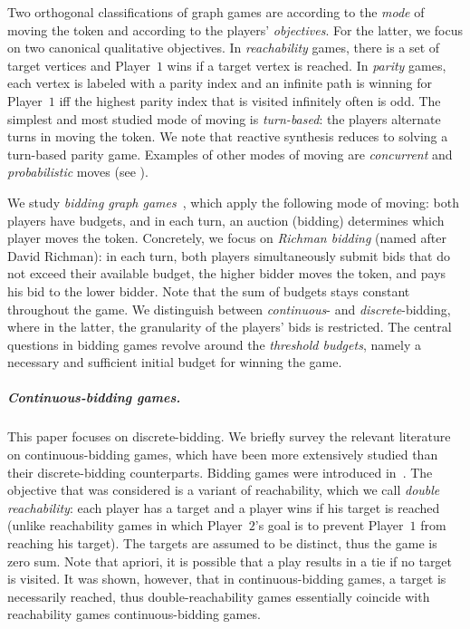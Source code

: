 \documentclass{article}\providecommand{\nequiv}{\not\equiv}\usepackage[a4paper,margin=20mm]{geometry}
\newcommand{\PO}{Player~$1$\xspace}
\newcommand{\PT}{Player~$2$\xspace}
\begin{document}
Two orthogonal classifications of graph games are according to the {\em mode} of moving the token and according to the players' {\em objectives}. For the latter, we focus on two canonical qualitative objectives. In {\em reachability} games, there is a set of target vertices and \PO wins if a target vertex is reached. 
In {\em parity} games, each vertex is labeled with a parity index and an infinite path is winning for \PO iff the highest parity index that is visited infinitely often is odd. The simplest and most studied mode of moving is {\em turn-based}:  the players alternate turns in moving the token. We note that reactive synthesis reduces to solving a turn-based parity game. Examples of other modes of moving are {\em concurrent} and {\em probabilistic} moves (see \cite{AG11}). 

We study \emph{bidding graph games}~\cite{LLPU96,LLPSU99}, which apply the following mode of moving: both players have budgets, and in each turn, an auction (bidding) determines which player moves the token. Concretely, we focus on {\em Richman bidding} (named after David Richman): in each turn, both players simultaneously submit bids that do not exceed their available budget, the higher bidder moves the token, and pays his bid to the lower bidder. Note that the sum of budgets stays constant throughout the game. 
We distinguish between {\em continuous}- and {\em discrete}-bidding, where in the latter, the granularity of the players' bids is restricted. 
The central questions in bidding games revolve around the {\em threshold budgets}, namely a necessary and sufficient initial budget for winning the game. 


\subparagraph*{Continuous-bidding games.} 
This paper focuses on discrete-bidding. We briefly survey the relevant literature on continuous-bidding games, which have been more extensively studied than their discrete-bidding counterparts. Bidding games were introduced in~\cite{LLPU96,LLPSU99}. The objective that was considered is a variant of reachability, which we call {\em double reachability}: each player has a target and a player wins if his target is reached (unlike reachability games in which \PT's goal is to prevent \PO from reaching his target). The targets are assumed to be distinct, thus the game is zero sum. Note that apriori, it is possible that a play results in a tie if no target is visited. It was shown, however, that in continuous-bidding games, a target is necessarily reached, thus double-reachability games essentially coincide with reachability games continuous-bidding games. 
\end{document}
